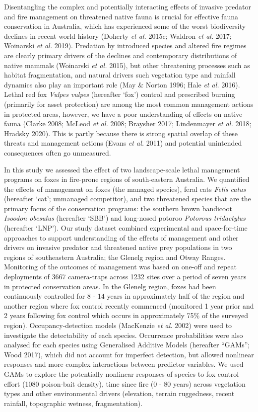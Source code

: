 \documentclass[11pt,a4paper,titlepage,twoside,openright]{style/unimelbthesis}
\begin{document}
\begin{mainmatter}
Disentangling the complex and potentially interacting effects of invasive predator and fire management on threatened native fauna is crucial for effective fauna conservation in Australia, which has experienced some of the worst biodiversity declines in recent world history (Doherty \emph{et al.} 2015c; Waldron \emph{et al.} 2017; Woinarski \emph{et al.} 2019). Predation by introduced species and altered fire regimes are clearly primary drivers of the declines and contemporary distributions of native mammals (Woinarski \emph{et al.} 2015), but other threatening processes such as habitat fragmentation, and natural drivers such vegetation type and rainfall dynamics also play an important role (May \& Norton 1996; Hale \emph{et al.} 2016). Lethal red fox \emph{Vulpes vulpes} (hereafter `fox') control and prescribed burning (primarily for asset protection) are among the most common management actions in protected areas, however, we have a poor understanding of effects on native fauna (Clarke 2008; McLeod \emph{et al.} 2008; Braysher 2017; Lindenmayer \emph{et al.} 2018; Hradsky 2020). This is partly because there is strong spatial overlap of these threats and management actions (Evans \emph{et al.} 2011) and potential unintended consequences often go unmeasured.

In this study we assessed the effect of two landscape-scale lethal management programs on foxes in fire-prone regions of south-eastern Australia. We quantified the effects of management on foxes (the managed species), feral cats \emph{Felis catus} (hereafter `cat'; unmanaged competitor), and two threatened species that are the primary focus of the conservation programs: the southern brown bandicoot \emph{Isoodon obesulus} (hereafter `SBB') and long-nosed potoroo \emph{Potorous tridactylus} (hereafter `LNP'). Our study dataset combined experimental and space-for-time approaches to support understanding of the effects of management and other drivers on invasive predator and threatened native prey populations in two regions of southeastern Australia; the Glenelg region and Otway Ranges. Monitoring of the outcomes of management was based on one-off and repeat deployments of 3667 camera-traps across 1232 sites over a period of seven years in protected conservation areas. In the Glenelg region, foxes had been continuously controlled for 8 - 14 years in approximately half of the region and another region where fox control recently commenced (monitored 1 year prior and 2 years following fox control which occurs in approximately 75\% of the surveyed region). Occupancy-detection models (MacKenzie \emph{et al.} 2002) were used to investigate the detectability of each species. Occurrence probabilities were also analysed for each species using Generalised Additive Models (hereafter ``GAMs''; Wood 2017), which did not account for imperfect detection, but allowed nonlinear responses and more complex interactions between predictor variables. We used GAMs to explore the potentially nonlinear responses of species to fox control effort (1080 poison-bait density), time since fire (0 - 80 years) across vegetation types and other environmental drivers (elevation, terrain ruggedness, recent rainfall, topographic wetness, fragmentation).


\end{mainmatter}
\end{document}
